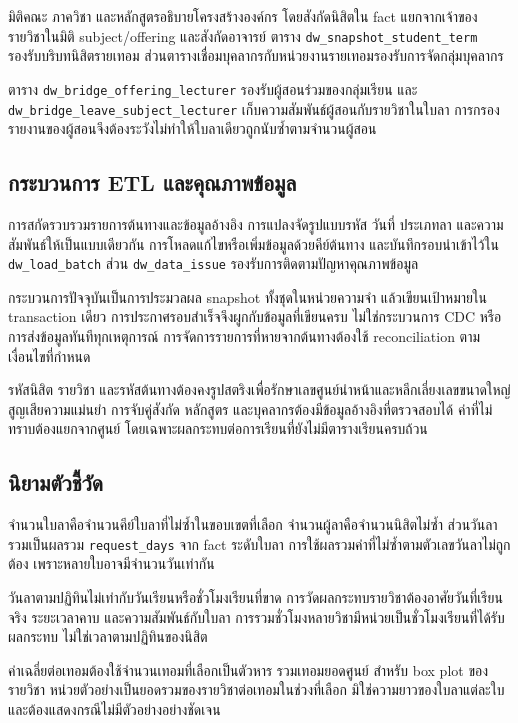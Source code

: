 มิติคณะ ภาควิชา และหลักสูตรอธิบายโครงสร้างองค์กร โดยสังกัดนิสิตใน fact แยกจากเจ้าของรายวิชาในมิติ subject/offering และสังกัดอาจารย์ ตาราง \nolinkurl{dw_snapshot_student_term} รองรับบริบทนิสิตรายเทอม ส่วนตารางเชื่อมบุคลากรกับหน่วยงานรายเทอมรองรับการจัดกลุ่มบุคลากร

ตาราง \nolinkurl{dw_bridge_offering_lecturer} รองรับผู้สอนร่วมของกลุ่มเรียน และ \nolinkurl{dw_bridge_leave_subject_lecturer} เก็บความสัมพันธ์ผู้สอนกับรายวิชาในใบลา การกรองรายงานของผู้สอนจึงต้องระวังไม่ทำให้ใบลาเดียวถูกนับซ้ำตามจำนวนผู้สอน

\subsection{กระบวนการ ETL และคุณภาพข้อมูล}
การสกัดรวบรวมรายการต้นทางและข้อมูลอ้างอิง การแปลงจัดรูปแบบรหัส วันที่ ประเภทลา และความสัมพันธ์ให้เป็นแบบเดียวกัน การโหลดแก้ไขหรือเพิ่มข้อมูลด้วยคีย์ต้นทาง และบันทึกรอบนำเข้าไว้ใน \nolinkurl{dw_load_batch} ส่วน \nolinkurl{dw_data_issue} รองรับการติดตามปัญหาคุณภาพข้อมูล

กระบวนการปัจจุบันเป็นการประมวลผล snapshot ทั้งชุดในหน่วยความจำ แล้วเขียนเป้าหมายใน transaction เดียว การประกาศรอบสำเร็จจึงผูกกับข้อมูลที่เขียนครบ ไม่ใช่กระบวนการ CDC หรือการส่งข้อมูลทันทีทุกเหตุการณ์ การจัดการรายการที่หายจากต้นทางต้องใช้ reconciliation ตามเงื่อนไขที่กำหนด

รหัสนิสิต รายวิชา และรหัสต้นทางต้องคงรูปสตริงเพื่อรักษาเลขศูนย์นำหน้าและหลีกเลี่ยงเลขขนาดใหญ่สูญเสียความแม่นยำ การจับคู่สังกัด หลักสูตร และบุคลากรต้องมีข้อมูลอ้างอิงที่ตรวจสอบได้ ค่าที่ไม่ทราบต้องแยกจากศูนย์ โดยเฉพาะผลกระทบต่อการเรียนที่ยังไม่มีตารางเรียนครบถ้วน

\subsection{นิยามตัวชี้วัด}
จำนวนใบลาคือจำนวนคีย์ใบลาที่ไม่ซ้ำในขอบเขตที่เลือก จำนวนผู้ลาคือจำนวนนิสิตไม่ซ้ำ ส่วนวันลารวมเป็นผลรวม \nolinkurl{request_days} จาก fact ระดับใบลา การใช้ผลรวมค่าที่ไม่ซ้ำตามตัวเลขวันลาไม่ถูกต้อง เพราะหลายใบอาจมีจำนวนวันเท่ากัน

วันลาตามปฏิทินไม่เท่ากับวันเรียนหรือชั่วโมงเรียนที่ขาด การวัดผลกระทบรายวิชาต้องอาศัยวันที่เรียนจริง ระยะเวลาคาบ และความสัมพันธ์กับใบลา การรวมชั่วโมงหลายวิชามีหน่วยเป็นชั่วโมงเรียนที่ได้รับผลกระทบ ไม่ใช่เวลาตามปฏิทินของนิสิต

ค่าเฉลี่ยต่อเทอมต้องใช้จำนวนเทอมที่เลือกเป็นตัวหาร รวมเทอมยอดศูนย์ สำหรับ box plot ของรายวิชา หน่วยตัวอย่างเป็นยอดรวมของรายวิชาต่อเทอมในช่วงที่เลือก มิใช่ความยาวของใบลาแต่ละใบ และต้องแสดงกรณีไม่มีตัวอย่างอย่างชัดเจน

